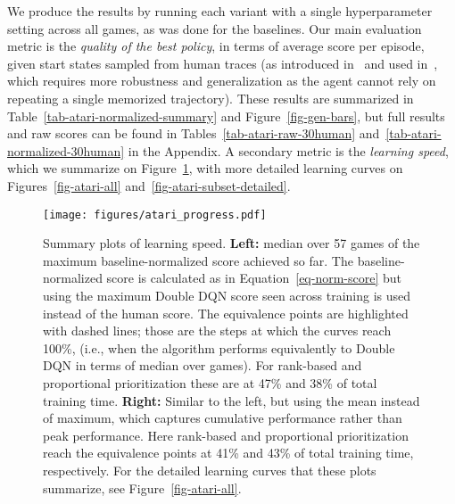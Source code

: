 \documentclass[a4paper]{article}
\begin{document}
We produce the results by running each variant with a single hyperparameter setting across all games, as was done for the baselines.
Our main evaluation metric is the \emph{quality of the best policy}, in terms of average score per episode, given start states sampled from human traces 
(as introduced in~\citealp{gorila} and used in~\citealp{double-dqn},
which requires more robustness and generalization as the agent cannot rely on repeating a single memorized trajectory).   
These results are summarized in Table~\ref{tab-atari-normalized-summary} and Figure~\ref{fig-gen-bars}, 
but full results and raw scores can be found in 
Tables~\ref{tab-atari-raw-30human} and~\ref{tab-atari-normalized-30human} in the Appendix.
A secondary metric is the \emph{learning speed}, which we summarize on Figure~\ref{fig-atari-progress}, with more detailed learning curves on Figures~\ref{fig-atari-all} and~\ref{fig-atari-subset-detailed}.

\begin{figure}[tb]
\vspace{-1.5em}
\centerline{
\texttt{[image: figures/atari\_progress.pdf]}
}
\caption{
\label{fig-atari-progress}
Summary plots of learning speed. {\bf Left:} median over 57 games of the maximum baseline-normalized score achieved so far. The baseline-normalized score is calculated as in Equation~\ref{eq-norm-score} but using the maximum Double DQN score seen across training is used instead of the human score.  
The equivalence points are highlighted with dashed lines;
those are the steps at which the curves reach 100\%, (i.e., when the algorithm performs equivalently to Double DQN in terms of median over games). 
For rank-based and proportional prioritization these are at 47\% and 38\% of total training time.
{\bf Right:} Similar to the left, but using the mean instead of maximum, which captures cumulative performance rather than peak performance. 
Here rank-based and proportional prioritization reach the equivalence points at 41\% and 43\% of total training time, respectively.
For the detailed learning curves that these plots summarize, see Figure~\ref{fig-atari-all}.
\vspace{-1.em}
}
\end{figure}
\end{document}
